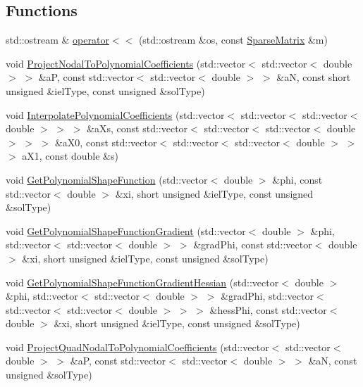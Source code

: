 \subsection*{Functions}
\begin{DoxyCompactItemize}
\item 
std\+::ostream \& \mbox{\hyperlink{namespacefemus_a88f7b502a0230a2f56a73940514264ca}{operator$<$$<$}} (std\+::ostream \&os, const \mbox{\hyperlink{classfemus_1_1_sparse_matrix}{Sparse\+Matrix}} \&m)
\item 
void \mbox{\hyperlink{namespacefemus_afdac57fc6d063ef9ea0b54b401222bc0}{Project\+Nodal\+To\+Polynomial\+Coefficients}} (std\+::vector$<$ std\+::vector$<$ double $>$ $>$ \&aP, const std\+::vector$<$ std\+::vector$<$ double $>$ $>$ \&aN, const short unsigned \&iel\+Type, const unsigned \&sol\+Type)
\item 
void \mbox{\hyperlink{namespacefemus_a351729c013d7b6818938252c320ad1ff}{Interpolate\+Polynomial\+Coefficients}} (std\+::vector$<$ std\+::vector$<$ std\+::vector$<$ double $>$ $>$ $>$ \&a\+Xs, const std\+::vector$<$ std\+::vector$<$ std\+::vector$<$ double $>$ $>$ $>$ \&a\+X0, const std\+::vector$<$ std\+::vector$<$ std\+::vector$<$ double $>$ $>$ $>$ a\+X1, const double \&s)
\item 
void \mbox{\hyperlink{namespacefemus_a0b417b15e6a459ced1afc29b5f28250e}{Get\+Polynomial\+Shape\+Function}} (std\+::vector$<$ double $>$ \&phi, const std\+::vector$<$ double $>$ \&xi, short unsigned \&iel\+Type, const unsigned \&sol\+Type)
\item 
void \mbox{\hyperlink{namespacefemus_aaa94526c56505b615727fd8d6cda22e2}{Get\+Polynomial\+Shape\+Function\+Gradient}} (std\+::vector$<$ double $>$ \&phi, std\+::vector$<$ std\+::vector$<$ double $>$ $>$ \&grad\+Phi, const std\+::vector$<$ double $>$ \&xi, short unsigned \&iel\+Type, const unsigned \&sol\+Type)
\item 
void \mbox{\hyperlink{namespacefemus_ab0032e28243ff5a107a12dfdc4672a47}{Get\+Polynomial\+Shape\+Function\+Gradient\+Hessian}} (std\+::vector$<$ double $>$ \&phi, std\+::vector$<$ std\+::vector$<$ double $>$ $>$ \&grad\+Phi, std\+::vector$<$ std\+::vector$<$ std\+::vector$<$ double $>$ $>$ $>$ \&hess\+Phi, const std\+::vector$<$ double $>$ \&xi, short unsigned \&iel\+Type, const unsigned \&sol\+Type)
\item 
void \mbox{\hyperlink{namespacefemus_aaa497abd19628ab5c62593028994890b}{Project\+Quad\+Nodal\+To\+Polynomial\+Coefficients}} (std\+::vector$<$ std\+::vector$<$ double $>$ $>$ \&aP, const std\+::vector$<$ std\+::vector$<$ double $>$ $>$ \&aN, const unsigned \&sol\+Type)

\end{DoxyCompactItemize}
